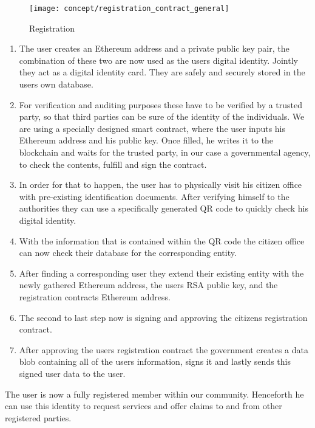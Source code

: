 \begin{figure}[ht]
\centering
\texttt{[image: concept/registration\_contract\_general]}
\caption{Registration}
\label{fig:registration_concept}
\end{figure}

\begin{enumerate}
\item \label{registrar_item_one}
The user creates an Ethereum address and a private public key pair, the combination of these two are now used as the users digital identity. Jointly they act as a digital identity card. They are safely and securely stored in the users own database.
\item \label{registrar_item_two}
For verification and auditing purposes these have to be verified by a trusted party, so that third parties can be sure of the identity of the individuals.
We are using a specially designed smart contract, where the user inputs his Ethereum address and his public key. Once filled, he writes it to the blockchain and waits for the trusted party, in our case a governmental agency, to check the contents, fulfill and sign the contract.
\item \label{registrar_item_three}
In order for that to happen, the user has to physically visit his citizen office with pre-existing identification documents. After verifying himself to the authorities they can use a specifically generated QR code to quickly check his digital identity.
\item \label{registrar_item_four}
With the information that is contained within the QR code the citizen office can now check their database for the corresponding entity.
\item \label{registrar_item_five}
After finding a corresponding user they extend their existing entity with the newly gathered Ethereum address, the users RSA public key, and the registration contracts Ethereum address.
\item \label{registrar_item_six}
The second to last step now is signing and approving the citizens registration contract.
\item \label{registrar_item_seven}
After approving the users registration contract the government creates a data blob containing all of the users information, signs it and lastly sends this signed user data to the user.
\end{enumerate}
The user is now a fully registered member within our community. Henceforth he can use this identity to request services and offer claims to and from other registered parties. 

